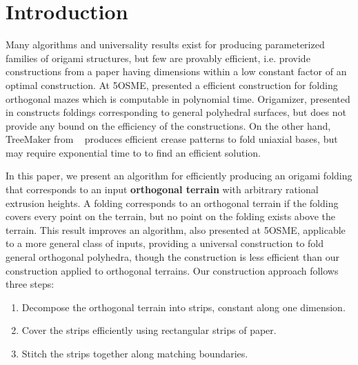 \section{Introduction}
\label{sec:introduction}

Many algorithms and universality results exist for producing parameterized
families of origami structures, but few are provably efficient, i.e. provide
constructions from a paper having dimensions within a low constant factor of an
optimal construction. At 5OSME, \cite{MazeFolding_Origami5} presented a
efficient construction for folding orthogonal mazes which is computable in
polynomial time. Origamizer, presented in \cite{Origamizer_SoCG2017} constructs
foldings corresponding to general polyhedral surfaces, but does not provide any
bound on the efficiency of the constructions. On the other hand, TreeMaker from
~\cite{Lang} produces efficient crease patterns to fold uniaxial bases, but may
require exponential time to to find an efficient solution. 

In this paper, we present an algorithm for efficiently producing an origami
folding that corresponds to an input {\bf orthogonal terrain} with arbitrary
rational extrusion heights. A folding corresponds to an orthogonal terrain if
the folding covers every point on the terrain, but no point on the folding
exists above the terrain. This result improves an algorithm,
\cite{BoxPleating_Origami5} also presented at 5OSME, applicable to a more
general class of inputs, providing a universal construction to fold general
orthogonal polyhedra, though the construction is less efficient than our
construction applied to orthogonal terrains. Our construction approach follows
three steps: 

\vspace{-0.2pc} 
\begin{enumerate} 
\item Decompose the orthogonal terrain into strips, constant along one dimension.
\item Cover the strips efficiently using rectangular strips of paper.
\item Stitch the strips together along matching boundaries.
\end{enumerate}
\vspace{-0.2pc}

